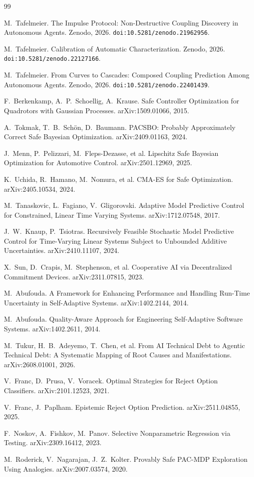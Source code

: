 \documentclass[11pt,a4paper]{article}
\begin{document}
\begin{thebibliography}{99}
\itemsep0pt

 M.~Tafelmeier.
The Impulse Protocol: Non-Destructive Coupling Discovery in
Autonomous Agents. Zenodo, 2026.
\texttt{doi:10.5281/zenodo.21962956}.

 M.~Tafelmeier.
Calibration of Automatic Characterization. Zenodo, 2026.
\texttt{doi:10.5281/zenodo.22127166}.

 M.~Tafelmeier.
From Curves to Cascades: Composed Coupling Prediction Among
Autonomous Agents. Zenodo, 2026.
\texttt{doi:10.5281/zenodo.22401439}.

 F.~Berkenkamp, A.~P.~Schoellig,
A.~Krause.
Safe Controller Optimization for Quadrotors with Gaussian Processes.
arXiv:1509.01066, 2015.

 A.~Tokmak, T.~B.~Sch\"on, D.~Baumann.
PACSBO: Probably Approximately Correct Safe Bayesian Optimization.
arXiv:2409.01163, 2024.

 J.~Menn, P.~Pelizzari, M.~Fleps-Dezasse, et al.
Lipschitz Safe Bayesian Optimization for Automotive Control.
arXiv:2501.12969, 2025.

 K.~Uchida, R.~Hamano, M.~Nomura, et al.
CMA-ES for Safe Optimization. arXiv:2405.10534, 2024.

 M.~Tanaskovic, L.~Fagiano,
V.~Gligorovski.
Adaptive Model Predictive Control for Constrained, Linear Time
Varying Systems. arXiv:1712.07548, 2017.

 J.~W.~Knaup, P.~Tsiotras.
Recursively Feasible Stochastic Model Predictive Control for
Time-Varying Linear Systems Subject to Unbounded Additive
Uncertainties. arXiv:2410.11107, 2024.

 X.~Sun, D.~Crapis, M.~Stephenson, et al.
Cooperative AI via Decentralized Commitment Devices.
arXiv:2311.07815, 2023.

 M.~Abufouda.
A Framework for Enhancing Performance and Handling Run-Time
Uncertainty in Self-Adaptive Systems. arXiv:1402.2144, 2014.

 M.~Abufouda.
Quality-Aware Approach for Engineering Self-Adaptive Software
Systems. arXiv:1402.2611, 2014.

 M.~Tukur, H.~B.~Adeyemo, T.~Chen, et al.
From AI Technical Debt to Agentic Technical Debt: A Systematic
Mapping of Root Causes and Manifestations. arXiv:2608.01001, 2026.

 V.~Franc, D.~Prusa, V.~Voracek.
Optimal Strategies for Reject Option Classifiers.
arXiv:2101.12523, 2021.

 V.~Franc, J.~Paplham.
Epistemic Reject Option Prediction. arXiv:2511.04855, 2025.

 F.~Noskov, A.~Fishkov, M.~Panov.
Selective Nonparametric Regression via Testing. arXiv:2309.16412,
2023.

 M.~Roderick, V.~Nagarajan, J.~Z.~Kolter.
Provably Safe PAC-MDP Exploration Using Analogies.
arXiv:2007.03574, 2020.

\end{thebibliography}
\end{document}
